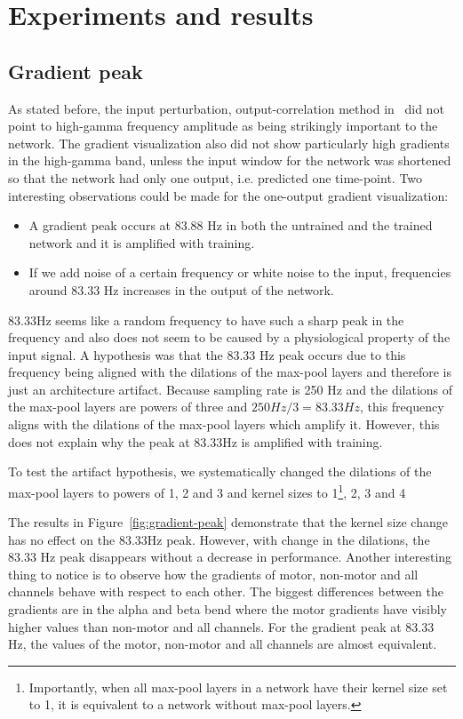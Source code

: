 \chapter{Experiments and results}
\label{ch:exp}

\section{Gradient peak}\label{sec:gradient-peak}
As stated before, the input perturbation, output-correlation method in~\cite{Hammer-2021} did not point to high-gamma frequency amplitude as being strikingly important to the network. The gradient visualization also did not show particularly high gradients in the high-gamma band, unless the input window for the network was shortened so that the network had only one output, i.e. predicted one time-point. Two interesting observations could be made for the one-output gradient visualization:
\begin{itemize}
\item[1.] A gradient peak occurs at 83.88 Hz in both the untrained and the trained network and it is amplified with training.
\item[2.] If we add noise of a certain frequency or white noise to the input, frequencies around 83.33 Hz increases in the output of the network.
\end{itemize}

83.33Hz seems like a random frequency to have such a sharp peak in the frequency and also does not seem to be caused by a physiological property of the input signal.
A hypothesis was that the 83.33 Hz peak occurs due to this frequency being aligned with the dilations of the max-pool layers and therefore is just an architecture artifact.
Because sampling rate is 250 Hz and the dilations of the max-pool layers are powers of three and $250 Hz / 3 = 83.33 Hz$, this frequency aligns with the dilations of the max-pool layers which amplify it.
However, this does not explain why the peak at 83.33Hz is amplified with training.

To test the artifact hypothesis, we systematically changed the dilations of the max-pool layers to powers of 1, 2 and 3 and kernel sizes to 1\footnote{Importantly, when all max-pool layers in a network have their kernel size set to 1, it is equivalent to a network without max-pool layers.}, 2, 3 and 4

The results in Figure~\ref{fig:gradient-peak} demonstrate that the kernel size change has no effect on the 83.33Hz peak.
However, with change in the dilations, the 83.33 Hz peak disappears without a decrease in performance.
Another interesting thing to notice is to observe how the gradients of motor, non-motor and all channels behave with respect to each other.
The biggest differences between the gradients are in the alpha and beta bend where the motor gradients have visibly higher values than non-motor and all channels.
For the gradient peak at 83.33 Hz, the values of the motor, non-motor and all channels are almost equivalent.

